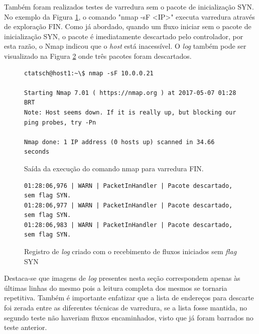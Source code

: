 Também foram realizados testes de varredura sem o pacote de inicialização SYN. No exemplo da Figura \ref{fig:outnmapsf}, o comando "nmap -sF <IP>" executa varredura através de exploração FIN. Como já abordado, quando um fluxo iniciar sem o pacote de inicialização SYN, o pacote é imediatamente descartado pelo controlador, por esta razão, o Nmap indicou que o \textit{host} está inacessível. O \textit{log} também pode ser visualizado na Figura \ref{fig:logfin} onde três pacotes foram descartados.


\begin{figure}[H]
\centering
\caption{Saída da execução do comando nmap para varredura FIN.}
\begin{lstlisting}[belowskip=-0.05\baselineskip]
ctatsch@host1:~\$ nmap -sF 10.0.0.21

Starting Nmap 7.01 ( https://nmap.org ) at 2017-05-07 01:28 BRT
Note: Host seems down. If it is really up, but blocking our ping probes, try -Pn

Nmap done: 1 IP address (0 hosts up) scanned in 34.66 seconds
\end{lstlisting}
\label{fig:outnmapsf}
\end{figure}


\begin{figure}[H]
\centering
\caption{Registro de \textit{log} criado com o recebimento de fluxos iniciados sem \textit{flag} SYN}
\begin{lstlisting}[belowskip=-0.05\baselineskip]
01:28:06,976 | WARN | PacketInHandler | Pacote descartado, sem flag SYN.
01:28:06,977 | WARN | PacketInHandler | Pacote descartado, sem flag SYN.
01:28:06,983 | WARN | PacketInHandler | Pacote descartado, sem flag SYN.
\end{lstlisting}
\label{fig:logfin}
\end{figure}
\FloatBarrier

Destaca-se que imagens de \textit{log} presentes nesta seção correspondem apenas às últimas linhas do mesmo pois a leitura completa dos mesmos se tornaria repetitiva. Também é importante enfatizar que a lista de endereços para descarte foi zerada entre as diferentes técnicas de varredura, se a lista fosse mantida, no segundo teste não haveriam fluxos encaminhados, visto que já foram barrados no teste anterior.

